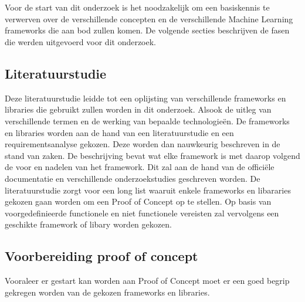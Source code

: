 
\chapter{}%
\label{ch:methodologie}


Voor de start van dit onderzoek is het noodzakelijk om een basiskennis te verwerven over de verschillende concepten en de verschillende Machine Learning frameworks die aan bod zullen komen. De volgende secties beschrijven de fasen die werden uitgevoerd voor dit onderzoek.

\section{Literatuurstudie}


Deze literatuurstudie leidde tot een oplijsting van verschillende frameworks en libraries die gebruikt zullen worden in dit onderzoek. Alsook de uitleg van verschillende termen en de werking van bepaalde technologieën.
De frameworks en libraries worden aan de hand van een literatuurstudie en een requirementsanalyse gekozen. Deze worden dan nauwkeurig beschreven in de stand van zaken. De beschrijving bevat wat elke framework is met daarop volgend de voor en nadelen van het framework.
Dit zal aan de hand van de officiële documentatie en verschillende onderzoekstudies geschreven worden.
De literatuurstudie zorgt voor een long list waaruit enkele frameworks en libararies gekozen gaan worden om een Proof of Concept op te stellen.
Op basis van voorgedefinieerde functionele en niet functionele vereisten zal vervolgens een geschikte framework of libary worden gekozen.
\section{Voorbereiding proof of concept}
Vooraleer er gestart kan worden aan Proof of Concept moet er een goed begrip gekregen worden van de gekozen frameworks en libraries. 
